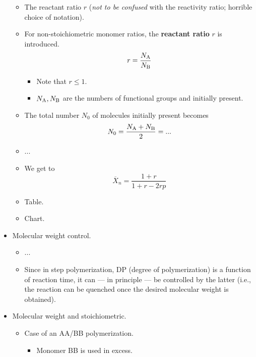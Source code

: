 \documentclass[../notes.tex]{subfiles}
\begin{document}
\begin{itemize}
    \begin{itemize}
        \item The reactant ratio $r$ (\emph{not to be confused} with the reactivity ratio; horrible choice of notation).
        \item For non-stoichiometric monomer ratios, the \textbf{reactant ratio} $r$ is introduced.
        \begin{equation*}
            r = \frac{N_{\ce{A}}}{N_{\ce{B}}}
        \end{equation*}
        \begin{itemize}
            \item Note that $r\leq 1$.
            \item $N_{\ce{A}},N_{\ce{B}}$ are the numbers of functional groups  and  initially present.
        \end{itemize}
        \item The total number $N_0$ of molecules initially present becomes
        \begin{equation*}
            N_0 = \frac{N_{\ce{A}}+N_{\ce{B}}}{2}
            = ...
        \end{equation*}
        \item ...
        \item We get to
        \begin{equation*}
            \overline{X}_n = \frac{1+r}{1+r-2rp}
        \end{equation*}
        \item Table.
        \item Chart.
    \end{itemize}
    \item Molecular weight control.
    \begin{itemize}
        \item ...
        \item Since in step polymerization, DP (degree of polymerization) is a function of reaction time, it can --- in principle --- be controlled by the latter (i.e., the reaction can be quenched once the desired molecular weight is obtained).
    \end{itemize}
    \item Molecular weight and stoichiometric.
    \begin{itemize}
        \item Case of an AA/BB polymerization.
        \begin{itemize}
            \item Monomer BB is used in excess.

\end{itemize}
\end{itemize}
\end{itemize}
\end{document}
